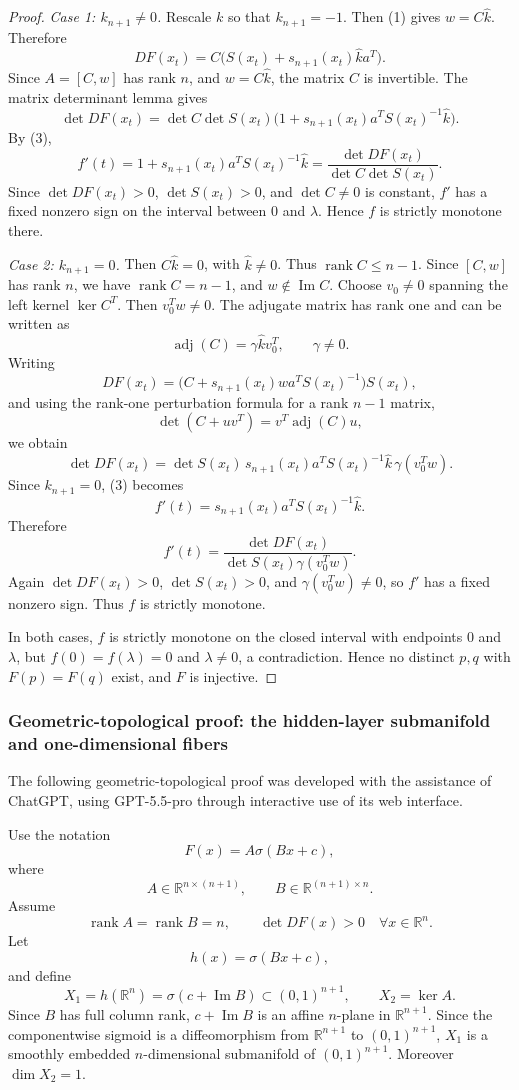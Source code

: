 \documentclass[a4paper,11pt]{article}
\theoremstyle{plain}
\theoremstyle{definition}
\theoremstyle{remark}
\DeclareMathOperator{\rank}{rank}
\DeclareMathOperator{\Imop}{Im}
\DeclareMathOperator{\adj}{adj}
\begin{document}
\begin{proof}
\emph{Case 1: \(k_{n+1}\ne0\).} Rescale \(k\) so that \(k_{n+1}=-1\). Then (1) gives \(w=C\widehat k\). Therefore
\[
DF(x_t)=C\bigl(S(x_t)+s_{n+1}(x_t)\widehat k a^T\bigr).
\]
Since \(A=[C,w]\) has rank \(n\), and \(w=C\widehat k\), the matrix \(C\) is invertible. The matrix determinant lemma gives
\[
\det DF(x_t)=\det C\det S(x_t)\bigl(1+s_{n+1}(x_t)a^TS(x_t)^{-1}\widehat k\bigr).
\]
By (3),
\[
f'(t)=1+s_{n+1}(x_t)a^TS(x_t)^{-1}\widehat k
=\frac{\det DF(x_t)}{\det C\det S(x_t)}.
\]
Since \(\det DF(x_t)>0\), \(\det S(x_t)>0\), and \(\det C\ne0\) is constant, \(f'\) has a fixed nonzero sign on the interval between \(0\) and \(\lambda\). Hence \(f\) is strictly monotone there.

\emph{Case 2: \(k_{n+1}=0\).} Then \(C\widehat k=0\), with \(\widehat k\ne0\). Thus \(\rank C\le n-1\). Since \([C,w]\) has rank \(n\), we have \(\rank C=n-1\), and \(w\notin\Imop C\). Choose \(v_0\ne0\) spanning the left kernel \(\ker C^T\). Then \(v_0^Tw\ne0\). The adjugate matrix has rank one and can be written as
\[
\adj(C)=\gamma\widehat k v_0^T,
\qquad \gamma\ne0. \tag{4}
\]
Writing
\[
DF(x_t)=\bigl(C+s_{n+1}(x_t)w a^T S(x_t)^{-1}\bigr)S(x_t),
\]
and using the rank-one perturbation formula for a rank \(n-1\) matrix,
\[
\det(C+uv^T)=v^T\adj(C)u,
\]
we obtain
\[
\det DF(x_t)=\det S(x_t)\,s_{n+1}(x_t)a^TS(x_t)^{-1}\widehat k\,\gamma(v_0^Tw).
\]
Since \(k_{n+1}=0\), (3) becomes
\[
f'(t)=s_{n+1}(x_t)a^TS(x_t)^{-1}\widehat k.
\]
Therefore
\[
f'(t)=\frac{\det DF(x_t)}{\det S(x_t)\gamma(v_0^Tw)}.
\]
Again \(\det DF(x_t)>0\), \(\det S(x_t)>0\), and \(\gamma(v_0^Tw)\ne0\), so \(f'\) has a fixed nonzero sign. Thus \(f\) is strictly monotone.

In both cases, \(f\) is strictly monotone on the closed interval with endpoints \(0\) and \(\lambda\), but \(f(0)=f(\lambda)=0\) and \(\lambda\ne0\), a contradiction. Hence no distinct \(p,q\) with \(F(p)=F(q)\) exist, and \(F\) is injective.
\end{proof}

\subsubsection{Geometric-topological proof: the hidden-layer submanifold and one-dimensional fibers}

The following geometric-topological proof was developed with the assistance of ChatGPT, using GPT-5.5-pro through interactive use of its web interface.

Use the notation
\[
F(x)=A\sigma(Bx+c),
\]
where
\[
A\in\mathbb R^{n\times(n+1)},
\qquad
B\in\mathbb R^{(n+1)\times n}.
\]
Assume
\[
\rank A=\rank B=n,
\qquad
\det DF(x)>0\quad\forall x\in\mathbb R^n.
\]
Let
\[
h(x)=\sigma(Bx+c),
\]
and define
\[
X_1=h(\mathbb R^n)=\sigma(c+\Imop B)\subset(0,1)^{n+1},
\qquad
X_2=\ker A.
\]
Since \(B\) has full column rank, \(c+\Imop B\) is an affine \(n\)-plane in \(\mathbb R^{n+1}\). Since the componentwise sigmoid is a diffeomorphism from \(\mathbb R^{n+1}\) to \((0,1)^{n+1}\), \(X_1\) is a smoothly embedded \(n\)-dimensional submanifold of \((0,1)^{n+1}\). Moreover \(\dim X_2=1\).
\end{document}

